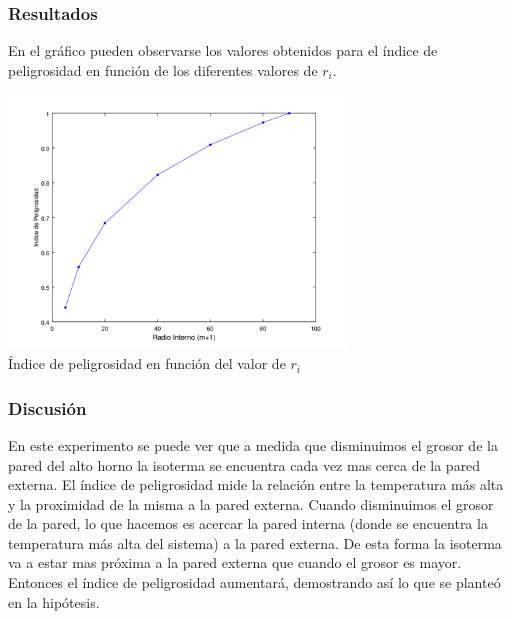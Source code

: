       \subsubsection*{Resultados}

        En el gráfico pueden observarse los valores obtenidos para el índice de peligrosidad en función de los diferentes valores de $r_i$.

          \begin{center}
            \includegraphics[width=9cm]{graficos/exp5/exp5.png} \\
            {\small Índice de peligrosidad en función del valor de $r_i$}
          \end{center}

      \subsubsection*{Discusión}
        En este experimento se puede ver que a medida que disminuimos el grosor de la pared del alto horno la isoterma se encuentra cada vez mas cerca de la pared externa. El índice de peligrosidad mide la relación entre la temperatura más alta y la proximidad de la misma a la pared externa. 
        Cuando disminuimos el grosor de la pared, lo que hacemos es acercar la pared interna (donde se encuentra la temperatura más alta del sistema) a la pared externa. De esta forma la isoterma va a estar mas próxima a la pared externa que cuando el grosor es mayor. Entonces el índice de peligrosidad aumentará, demostrando así lo que se planteó en la hipótesis.
